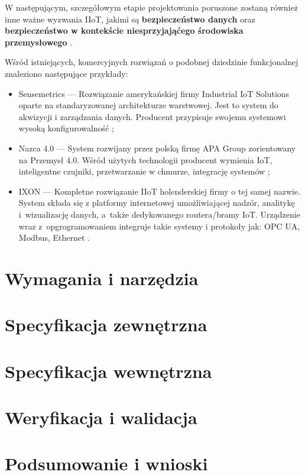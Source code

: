 \documentclass[a4paper, 12pt, twoside]{article}
\begin{document}
W następującym, szczegółowym etapie projektowania poruszone zostaną również 
inne ważne wyzwania IIoT, jakimi są \textbf{bezpieczeństwo danych} oraz \textbf{bezpieczeństwo w kontekście niesprzyjająćego
środowiska przemysłowego} \cite{iiot-challenges-opportunities-directions}.

Wśród istniejących, komercyjnych rozwiązań o podobnej dziedzinie funkcjonalnej
znaleziono następujące przykłady:
\begin{itemize}
    \itemsep0em 
    \item Sensemetrics --- Rozwiązanie amerykańskiej firmy Industrial IoT Solutions
    oparte na standaryzowanej architekturze warstwowej. Jest to system do akwizycji
    i zarządzania danych. Producent przypisuje swojemu systemowi wysoką konfigurowalność \cite{sensmetrics};
    \item Nazca 4.0 --- System rozwijany przez polską firmę APA Group zorientowany na Przemysł 4.0.
    Wśród użytych technologii producent wymienia IoT, inteligentne czujniki, 
    przetwarzanie w chmurze, integrację systemów \cite{nazca};
    \item IXON --- Kompletne rozwiązanie IIoT holenderskiej firmy o tej samej nazwie.
    System składa się z platformy internetowej umożliwiającej nadzór, analitykę i~wizualizację danych,
    a~także dedykowanego routera/bramy IoT. Urządzenie wraz z~opgrogramowaniem
    integruje takie systemy i protokoły jak: OPC UA, Modbus, Ethernet \cite{ixon}.
\end{itemize}



\section{Wymagania i narzędzia}

\section{Specyfikacja zewnętrzna}

\section{Specyfikacja wewnętrzna}

\section{Weryfikacja i walidacja}

\section{Podsumowanie i wnioski}

\printbibliography
\end{document}
